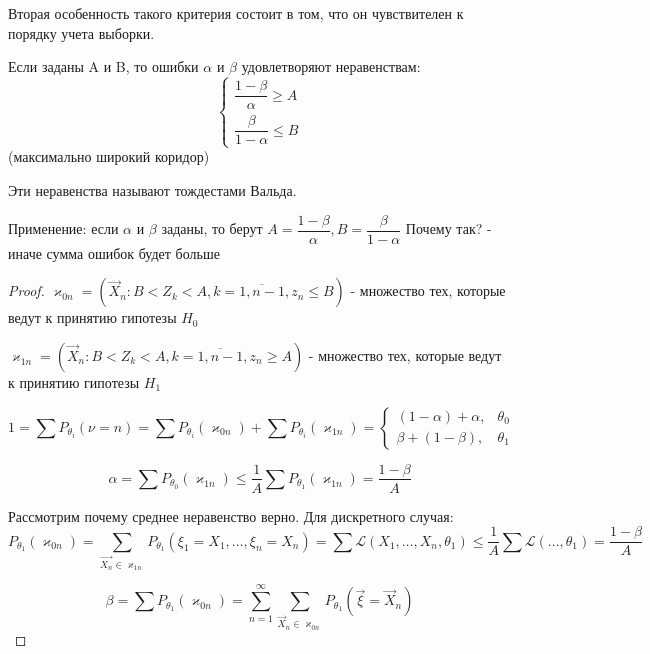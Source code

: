 Вторая особенность такого критерия состоит в том, что он чувствителен к порядку учета выборки.

\begin{theorem}[Вальда]
  Если заданы A и B, то ошибки $\alpha$ и $\beta$ удовлетворяют неравенствам:
  \begin{equation*}
    \begin{cases}
      \dfrac{1 - \beta}{\alpha} \geqslant A \\[1em]
      \dfrac{\beta}{1 - \alpha} \leqslant B
    \end{cases}
  \end{equation*}
  (максимально широкий коридор)

  Эти неравенства называют тождестами Вальда.

\end{theorem}

Применение: если $\alpha$ и $\beta$ заданы, то берут $A = \dfrac{1-\beta}{\alpha}, B = \dfrac{\beta}{1 - \alpha}$
Почему так? - иначе сумма ошибок будет больше

\begin{proof}
  $\varkappa_{0n} = \left( \vec{X}_n : B < Z_k < A, k = \overline{1, n-1}, z_n \leqslant B \right)$ - множество тех, которые ведут к принятию гипотезы $H_0$

  $\varkappa_{1n} = \left( \vec{X}_n : B < Z_k < A, k = \overline{1, n-1}, z_n \geqslant A \right)$ - множество тех, которые ведут к принятию гипотезы $H_1$

  \begin{equation*}
    1 = \sum  P_{\theta_i} (\nu = n) = \sum P_{\theta_i} (\varkappa_{0n}) + \sum P_{\theta_i} (\varkappa_{1n}) =
    \begin{cases}
      (1 - \alpha) + \alpha, &\theta_0 \\
      \beta + (1 - \beta), &\theta_1
    \end{cases} 
  \end{equation*}

  \[
    \alpha = \sum P_{\theta_0} (\varkappa_{1n}) \leqslant \dfrac{1}{A} \sum P_{\theta_1} (\varkappa_{1n}) = \dfrac{1 - \beta}{A}
  \]
  
  Рассмотрим почему среднее неравенство верно. Для дискретного случая:
  \[
    P_{\theta_1} (\varkappa_{0n}) = \sum_{\vec{X_n} \in \varkappa_{1n}} P_{\theta_1}(\xi_1 = X_1, \dots, \xi_n = X_n)= \sum \mathcal{L} (X_1, \dots, X_n, \theta_1) \leqslant \dfrac{1}{A} \sum \mathcal{L} (\dots, \theta_1) = \dfrac{1 - \beta}{A}
  \]

  \[
    \beta = \sum P_{\theta_1} (\varkappa_{0n}) = \sum_{n=1}^\infty \sum_{\vec{X}_n \in \varkappa_{0n}} P_{\theta_1} (\vec{\xi} = \vec{X}_n)
  \]
\end{proof}

